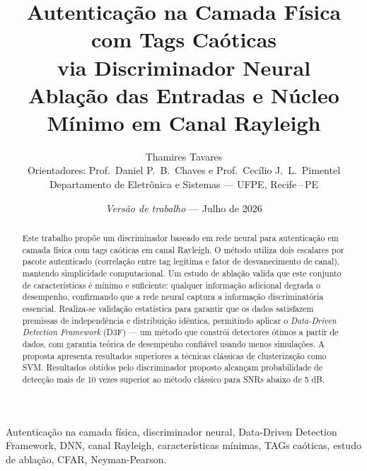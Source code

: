 \documentclass[12pt,a4paper]{article}
\begin{document}
\title{\textbf{Autenticação na Camada Física com Tags Caóticas\\via Discriminador Neural}\\[0.5em]
\large Ablação das Entradas e Núcleo Mínimo em Canal Rayleigh}

\author{Thamires Tavares\\[0.4em]
\small Orientadores: Prof.\ Daniel P.\ B.\ Chaves e Prof.\ Cecílio J.\ L.\ Pimentel\\
\small Departamento de Eletrônica e Sistemas --- UFPE, Recife\,--\,PE}

\date{\textit{Versão de trabalho} --- Julho de 2026}

\maketitle
\thispagestyle{empty}

\renewcommand{\abstractname}{Resumo}
\begin{abstract}
\noindent
Este trabalho propõe um discriminador baseado em rede neural para autenticação em camada física com tags caóticas em canal Rayleigh. O método utiliza dois escalares por pacote autenticado (correlação entre tag legítima e fator de desvanecimento de canal), mantendo simplicidade computacional. Um estudo de ablação valida que este conjunto de características é mínimo e suficiente: qualquer informação adicional degrada o desempenho, confirmando que a rede neural captura a informação discriminatória essencial. Realiza-se validação estatística para garantir que os dados satisfazem premissas de independência e distribuição idêntica, permitindo aplicar o \textit{Data-Driven Detection Framework} (D3F) --- um método que constrói detectores ótimos a partir de dados, com garantia teórica de desempenho confiável usando menos simulações. A proposta apresenta resultados superiores a técnicas clássicas de clusterização como SVM. Resultados obtidos pelo discriminador proposto alcançam probabilidade de detecção mais de 10 vezes superior ao método clássico para SNRs abaixo de 5 dB.

\end{abstract}

\begin{keywords}
Autenticação na camada física, discriminador neural, Data-Driven Detection Framework, DNN, canal Rayleigh, características mínimas, TAGs caóticas, estudo de ablação, CFAR, Neyman-Pearson.
\end{keywords}

\newpage
\tableofcontents
\newpage
\end{document}

